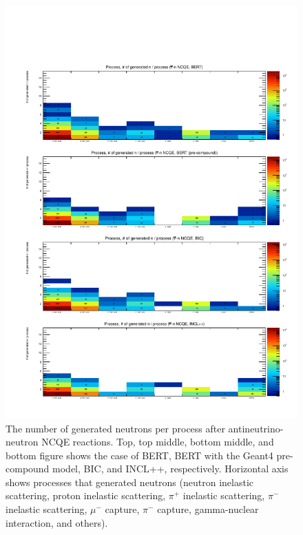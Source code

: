 \begin{figure}[h]
	\centering
	\includegraphics[width=15cm]{PDF/Secondary/Comparison_PreCompound/neutron/pdf2/Logz_Pro_NumSec_nubncqe_n}
	\caption[The number of generated neutrons per process after antineutrino-neutron NCQE reactions]{
	The number of generated neutrons per process after antineutrino-neutron NCQE reactions.
	Top, top middle, bottom middle, and bottom figure shows the case of BERT, BERT with the Geant4 pre-compound model, BIC, and INCL++, respectively.
	Horizontal axis shows processes that generated neutrons (neutron inelastic scattering, proton inelastic scattering, $\pi^{+}$ inelastic scattering, $\pi^{-}$ inelastic scattering, $\mu^{-}$ capture, $\pi^{-}$ capture, gamma-nuclear interaction, and others).
	}\label{Others_neutron_Logz_Pro_NumSec_nubncqe_n}
\end{figure}

